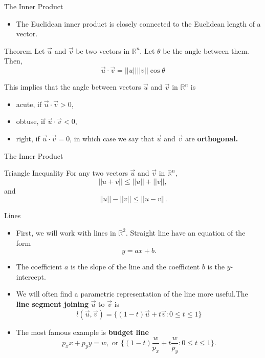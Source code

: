 \documentclass{beamer}
\begin{document}
\begin{frame}{The Inner Product}
\begin{itemize}
    \item The Euclidean inner product is closely connected to the Euclidean length of a vector. 
    
\end{itemize}
\begin{block}{Theorem}
Let $\vec{u}$ and $\vec{v}$ be two vectors in $\mathbb{R}^n$. Let $\theta$ be the angle between them. Then, 
\[\vec{u}\cdot\vec{v}=||u||||v||\cos{\theta}
\]
\end{block}
This implies that the angle between vectors $\vec{u}$ and $\vec{v}$ in $\mathbb{R}^n$ is 
\begin{itemize}
    \item acute, if $\vec{u}\cdot\vec{v}>0$,
    \item obtuse, if $\vec{u}\cdot\vec{v}<0$, 
    \item right, if $\vec{u}\cdot\vec{v}=0$, in which case we say that $\vec{u}$ and $\vec{v}$ are \textbf{orthogonal.}
\end{itemize}
\end{frame}

\begin{frame}{The Inner Product}
\begin{block}{Triangle Inequality}
For any two vectors $\vec{u}$ and $\vec{v}$ in $\mathbb{R}^n$,
\[||u+v||\leq ||u||+||v||,
\]
and 
\[||u||-||v||\leq ||u-v||.
\]
\end{block}

    
\end{frame}

\begin{frame}{Lines}
    \begin{itemize}
        \item First, we will work with lines in $\mathbb{R}^2$. Straight line have an equation of the form
        \[y=ax+b.
        \]
        \item The coefficient $a$ is the slope of the line and the coefficient $b$ is the $y$-intercept.
        \item We will often find a parametric representation of the line more useful.The \textbf{line segment joining} $\vec{u}$ to $\vec{v}$ is 
        \[  l(\vec{u}, \vec{v})=\{(1-t)\vec{u}+t\vec{v}:0\leq t\leq 1\}
        \]
        \item The most famous example is \textbf{budget line}
        \[p_xx+p_yy=w, \text{ or } \{(1-t)\frac{w}{p_x}+t\frac{w}{p_y}: 0\leq t\leq 1\}.
        \]
    \end{itemize}
\end{frame}
\end{document}
